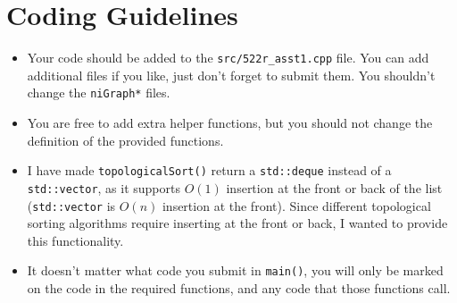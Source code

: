 \section{Coding Guidelines}
\begin{itemize}
	\item Your code should be added to the {\tt src/522r\_asst1.cpp} file.  You can add additional files if you like, just don't forget to submit them.  You shouldn't change the {\tt niGraph*} files.
  \item You are free to add extra helper functions, but you should not change the definition of the provided functions. 
	\item I have made {\tt topologicalSort()} return a  {\tt std::deque} instead of a {\tt std::vector}, as it supports $O(1)$ insertion at the front or back of the list ({\tt std::vector} is $O(n)$ insertion at the front).  Since different topological sorting algorithms require inserting at the front or back, I wanted to provide this functionality.
	\item It doesn't matter what code you submit in {\tt main()}, you will only be marked on the code in the required functions, and any code that those functions call.
\end{itemize}


